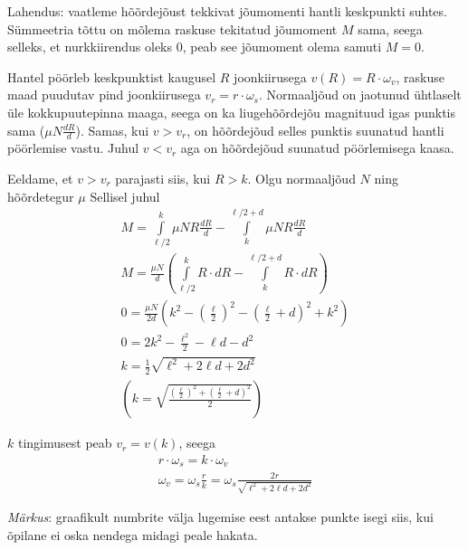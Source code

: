 \documentclass[10pt]{article}
\begin{document}

\solu
Lahendus: vaatleme hõõrdejõust tekkivat jõumomenti hantli keskpunkti suhtes. Sümmeetria tõttu on mõlema raskuse tekitatud jõumoment $M$ sama, seega selleks, et nurkkiirendus oleks $0$, peab see jõumoment olema samuti $M = 0$.

Hantel pöörleb keskpunktist kaugusel $R$ joonkiirusega $v(R) = R \cdot \omega_v$, raskuse maad puudutav pind joonkiirusega $v_r = r \cdot \omega_s$. Normaaljõud on jaotunud ühtlaselt üle kokkupuutepinna maaga, seega on ka liugehõõrdejõu magnituud igas punktis sama ($\mu N \frac{dR}{d}$). Samas, kui $v > v_r$, on hõõrdejõud selles punktis suunatud hantli pöörlemise vastu. Juhul $v < v_r$ aga on hõõrdejõud suunatud pöörlemisega kaasa.

Eeldame, et $v > v_r$ parajasti siis, kui $R > k$. Olgu normaaljõud $N$ ning hõõrdetegur $\mu$ Sellisel juhul
\begin{gather*}
    M = \int\limits_{\ell / 2}^{k} \mu N R \frac{dR}{d} - \int\limits_{k}^{\ell/2 + d} \mu N R \frac{dR}{d} \\
    M = \frac{\mu N}{d} \left ( \int\limits_{\ell / 2}^{k} R \cdot dR - \int\limits_{k}^{\ell/2 + d} R \cdot dR \right ) \\
    0 = \frac{\mu N}{2 d} \left ( k^2 - \left ( \frac{\ell}{2} \right )^2 - \left ( \frac{\ell}{2} + d \right )^2 + k^2 \right ) \\
    0 = 2 k^2 - \frac{\ell^2}{2} - \ell d - d^2 \\
    k = \frac{1}{2} \sqrt{\ell^2 + 2 \ell d + 2 d^2} \\
    \left ( k = \sqrt{\frac{\left ( \frac{\ell}{2}\right )^2 + \left ( \frac{\ell}{2} + d \right )^2}{2}}\right )
\end{gather*}

$k$ tingimusest peab $v_r = v(k)$, seega
\begin{gather*}
    r \cdot \omega_s = k \cdot \omega_v \\
    \omega_v = \omega_s \frac{r}{k} = \omega_s \frac{2r}{\sqrt{\ell^2 + 2 \ell d + 2 d^2}}
\end{gather*}
\probend
\bigskip


\solu
\emph{Märkus}: graafikult numbrite välja lugemise eest antakse punkte isegi siis, kui õpilane ei oska nendega midagi peale hakata.
\end{document}
